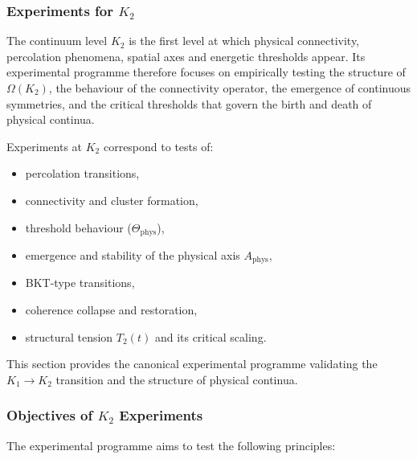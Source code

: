 
\subsubsection{Experiments for \texorpdfstring{$K_2$}{K_2}}
\label{sec:experiments-k2}

The continuum level $K_2$ is the first level at which physical connectivity,
percolation phenomena, spatial axes and energetic thresholds appear.  
Its experimental programme therefore focuses on empirically testing the 
structure of $\Omega(K_2)$, the behaviour of the connectivity operator, 
the emergence of continuous symmetries, and the critical thresholds that 
govern the birth and death of physical continua.

Experiments at $K_2$ correspond to tests of:
\begin{itemize}
    \item percolation transitions,
    \item connectivity and cluster formation,
    \item threshold behaviour ($\Theta_{\mathrm{phys}}$),
    \item emergence and stability of the physical axis $A_{\mathrm{phys}}$,
    \item BKT-type transitions,
    \item coherence collapse and restoration,
    \item structural tension $T_2(t)$ and its critical scaling.
\end{itemize}

This section provides the canonical experimental programme validating the 
$K_1 \rightarrow K_2$ transition and the structure of physical continua.



\subsubsection{Objectives of \texorpdfstring{$K_2$}{K_2} Experiments}

The experimental programme aims to test the following principles:

